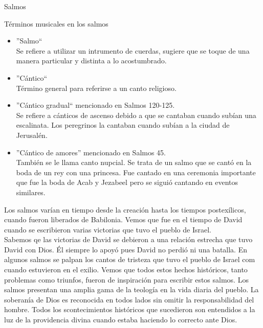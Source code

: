 \begin{section}{Salmos}
\begin{subsection}{Términos musicales en los salmos}
\begin{itemize}
				\newpage
			\item ''Salmo``\\
				Se refiere a utilizar un intrumento de cuerdas, sugiere que se toque de una manera particular y distinta a lo acostumbrado.
			\item ''Cántico``\\
				Término general para referirse a un canto religioso.
			\item ''Cántico gradual`` mencionado en Salmos 120-125.\\
				Se refiere a cánticos de ascenso debido a que se cantaban cuando subían una escalinata. Los peregrinos la cantaban cuando subían a la ciudad de Jerusalén.
			\item ''Cántico de amores'' mencionado en Salmos 45.\\
				También se le llama canto nupcial. Se trata de un salmo que se cantó en la boda de un rey con una princesa. Fue cantado en una ceremonia importante que fue la boda de Acab y Jezabeel pero se siguió cantando en eventos similares.
		\end{itemize}
	\end{subsection}
Los salmos varían en tiempo desde la creación hasta los tiempos postexílicos, cuando fueron liberados de Babilonia. Vemos que fue en el tiempo de David cuando se escribieron varias victorias que tuvo el pueblo de Israel.\\
Sabemos qe las victorias de David se debieron a una relación estrecha que tuvo David con Dios. Él siempre lo apoyó pues David no perdió ni una batalla. En algunos salmos se palpan los cantos de tristeza que tuvo el pueblo de Israel com cuando estuvieron en el exilio. Vemos que todos estos hechos históricos, tanto problemas como triunfos, fueron de inspiración para escribir estos salmos. Los salmos presentan una amplia gama de la teología en la vida diaria del pueblo. La soberanía de Dios es reconocida en todos lados sin omitir la responsabilidad del hombre. Todos los scontecimientos históricos que sucedieron son entendidos a la luz de la providencia divina cuando estaba haciendo lo correcto ante Dios. 
\end{section}
%


